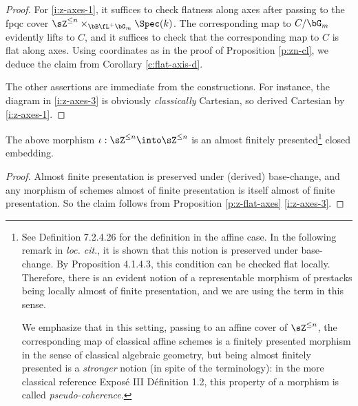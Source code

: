 \begin{proof}

For \eqref{i:z-axes-1}, it suffices to check
flatness along axes after passing to the fpqc cover
$\sZ^{\leq n} \times_{\bB \fL^+ \bG_m} \Spec(k)$.
The corresponding map to $C/\bG_m$ evidently lifts
to $C$, and it suffices to check that the corresponding
map to $C$ is flat along axes. Using coordinates
as in the proof of
Proposition \ref{p:zn-cl}, we deduce the claim
from Corollary \ref{c:flat-axis-d}.

The other assertions are immediate from the constructions.
For instance, the diagram in
\eqref{i:z-axes-3} is obviously \emph{classically}
Cartesian, so derived Cartesian by \eqref{i:z-axes-1}.

\end{proof}


\begin{cor}
\notready\label{c:iota-afp}

The above morphism
$\iota:\sZ^{\leq n} \into \sZ^{\leq n}$ is an
almost finitely presented\footnote{See
\cite{higheralgebra} Definition 7.2.4.26
for the definition in the affine case.
In the following remark in \emph{loc. cit}., it is shown
that this notion is preserved under base-change.
By \cite{sag} Proposition 4.1.4.3, this condition
can be checked flat locally. Therefore, there
is an evident notion of a representable
morphism of prestacks being locally almost of finite
presentation, and we are using the term in this
sense.

We emphasize that in this setting,
passing to an affine cover of $\sZ^{\leq n}$,
the corresponding map of classical affine
schemes is a finitely presented morphism in the sense
of classical algebraic geometry,
but being almost finitely presented is a
\emph{stronger} notion (in spite of the terminology):
in the more classical reference \cite{sga-6}
Expos\'e III D\'efinition 1.2, this property
of a morphism is called \emph{pseudo-coherence}.}
closed embedding.

\end{cor}

\begin{proof}

Almost finite presentation is preserved under
(derived) base-change, and any morphism of
schemes almost of finite presentation
is itself almost of finite presentation.
So the claim follows from
Proposition \ref{p:z-flat-axes} \eqref{i:z-axes-3}.

\end{proof}

